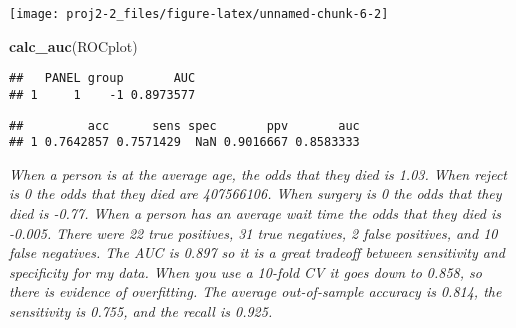 \documentclass[]{article}
\newenvironment{Shaded}{\begin{snugshade}}{\end{snugshade}}
\newcommand{\ControlFlowTok}[1]{\textcolor[rgb]{0.13,0.29,0.53}{\textbf{#1}}}
\newcommand{\DataTypeTok}[1]{\textcolor[rgb]{0.13,0.29,0.53}{#1}}
\newcommand{\DecValTok}[1]{\textcolor[rgb]{0.00,0.00,0.81}{#1}}
\newcommand{\KeywordTok}[1]{\textcolor[rgb]{0.13,0.29,0.53}{\textbf{#1}}}
\newcommand{\NormalTok}[1]{#1}
\newcommand{\OperatorTok}[1]{\textcolor[rgb]{0.81,0.36,0.00}{\textbf{#1}}}
\newcommand{\OtherTok}[1]{\textcolor[rgb]{0.56,0.35,0.01}{#1}}
\newcommand{\StringTok}[1]{\textcolor[rgb]{0.31,0.60,0.02}{#1}}
\begin{document}
\begin{center}\texttt{[image: proj2-2\_files/figure-latex/unnamed-chunk-6-2]} \end{center}

\begin{Shaded}
\begin{Highlighting}[]
\KeywordTok{calc_auc}\NormalTok{(ROCplot)}
\end{Highlighting}
\end{Shaded}

\begin{verbatim}
##   PANEL group       AUC
## 1     1    -1 0.8973577
\end{verbatim}

\begin{Shaded}
\end{Shaded}

\begin{verbatim}
##         acc      sens spec       ppv       auc
## 1 0.7642857 0.7571429  NaN 0.9016667 0.8583333
\end{verbatim}

\emph{When a person is at the average age, the odds that they died is
1.03. When reject is 0 the odds that they died are 407566106. When
surgery is 0 the odds that they died is -0.77. When a person has an
average wait time the odds that they died is -0.005. There were 22 true
positives, 31 true negatives, 2 false positives, and 10 false negatives.
The AUC is 0.897 so it is a great tradeoff between sensitivity and
specificity for my data. When you use a 10-fold CV it goes down to
0.858, so there is evidence of overfitting. The average out-of-sample
accuracy is 0.814, the sensitivity is 0.755, and the recall is 0.925.}
\end{document}
